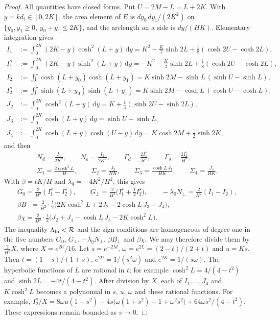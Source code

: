 \documentclass[11pt]{article}
\theoremstyle{remark}
\newcommand{\E}{E}
\newcommand{\dd}{\,\mathrm{d}}
\newcommand{\Gp}{G_{\perp}}
\newcommand{\Bp}{B_{\perp}}
\newcommand{\Np}{N_{\perp}}
\begin{document}
\begin{proof}
All quantities have closed forms. Put $U=2M-L=L+2K$. With $y=kd_i\in[0,2K]$, the area element of $\E$ is
$dy_0\,dy_1/(2K^2)$ on $\{y_0,y_1\ge0,\ y_0+y_1\le2K\}$, and the arclength on a side is $dy/(HK)$.
Elementary integration gives
\begin{align*}
 I_1&:=\int_0^{2K}(2K-y)\cosh^2(L+y)\dd y=K^2-\tfrac K2\sinh2L+\tfrac18(\cosh2U-\cosh2L),\\
 I_1^s&:=\int_0^{2K}(2K-y)\sinh^2(L+y)\dd y=-K^2-\tfrac K2\sinh2L+\tfrac18(\cosh2U-\cosh2L),\\
 I_2&:=\iint\cosh(L+y_0)\cosh(L+y_1)=K\sinh2M-\sinh L\,(\sinh U-\sinh L),\\
 I_2^s&:=\iint\sinh(L+y_0)\sinh(L+y_1)=K\sinh2M-\cosh L\,(\cosh U-\cosh L),\\
 J_2&:=\int_0^{2K}\cosh^2(L+y)\dd y=K+\tfrac14(\sinh2U-\sinh2L),\\
 J_3&:=\int_0^{2K}\cosh(L+y)\dd y=\sinh U-\sinh L,\\
 J_4&:=\int_0^{2K}\cosh(L+y)\cosh(U-y)\dd y=K\cosh2M+\tfrac12\sinh2K ,
\end{align*}
and then
\begin{gather*}
 N_d=\frac{I_1}{2K^2},\qquad N_o=\frac{I_2}{2K^2},\qquad \Gamma_d=\frac{2I_1^s}{H^2},\qquad
 \Gamma_o=\frac{2I_2^s}{H^2},\\
 \Sigma_1=\frac{2\cosh^2L}{H},\qquad \Sigma_2=\frac{J_2}{HK},\qquad
 \Sigma_3=\frac{\cosh L\,J_3}{HK},\qquad \Sigma_4=\frac{J_4}{HK}.
\end{gather*}
With $\beta=tK/H$ and $\lambda_0=-4K^2/H^2$, this gives
\begin{gather*}
 G_0=\tfrac2{H^2}(I_1^s-I_2^s),\qquad \Gp=\tfrac2{H^2}\bigl(I_1^s+\tfrac12I_2^s\bigr),\qquad
 -\lambda_0\Np=\tfrac2{H^2}(I_1-I_2),\\
 \beta \Bp=\tfrac2{H^2}\cdot\tfrac t2\bigl(2K\cosh^2L+2J_2-2\cosh L\,J_3-J_4\bigr),\\
 \beta\chi=\tfrac2{H^2}\cdot\tfrac t2\bigl(J_2+J_4-\cosh L\,J_3-2K\cosh^2L\bigr).
\end{gather*}
The inequality $\Lambda_{\rm hi}<\mathcal R$ and the sign conditions are homogeneous of degree one in
the five numbers $G_0$, $\Gp$, $-\lambda_0\Np$, $\beta \Bp$ and $\beta\chi$. We may therefore divide them
by $\frac2{H^2}X$, where $X=e^{2U}/16$. Let $s=e^{-2M}$, $\omega=e^{2L}=(2-t)/(2+t)$ and $u=Ks$. Then
$t=(1-s)/(1+s)$, $e^{2U}=1/(s^2\omega)$ and $e^{2K}=1/(s\omega)$. The hyperbolic functions of $L$ are
rational in $t$; for example $\cosh^2L=4/(4-t^2)$ and $\sinh2L=-4t/(4-t^2)$. After division by $X$, each of
$I_1,\dots,J_4$ and $K\cosh^2L$ becomes a polynomial in $s$, $u$, $\omega$ and these rational functions.
For example,
$I_2^s/X=8\omega u(1-s^2)-4s\bigl(\omega(1+s^2)+1+\omega^2s^2\bigr)+64\omega s^2/(4-t^2)$. These expressions
remain bounded as $s\to0$.


\end{proof}
\end{document}
